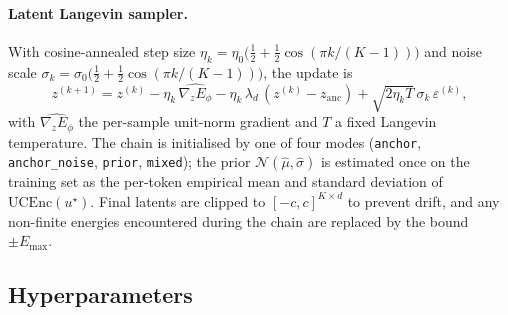 \documentclass{article}
\begin{document}
\paragraph{Latent Langevin sampler.}
With cosine-annealed step size $\eta_k = \eta_0\bigl(\tfrac{1}{2} + \tfrac{1}{2}\cos(\pi k/(K-1))\bigr)$ and noise scale $\sigma_k = \sigma_0\bigl(\tfrac{1}{2} + \tfrac{1}{2}\cos(\pi k/(K-1))\bigr)$, the update is
\begin{equation}
z^{(k+1)} = z^{(k)} - \eta_k\,\widehat{\nabla_z E_\phi} - \eta_k\,\lambda_d\,(z^{(k)} - z_{\mathrm{anc}}) + \sqrt{2\eta_k T}\,\sigma_k\,\varepsilon^{(k)},
\end{equation}
with $\widehat{\nabla_z E_\phi}$ the per-sample unit-norm gradient and $T$ a fixed Langevin temperature. The chain is initialised by one of four modes (\texttt{anchor}, \texttt{anchor\_noise}, \texttt{prior}, \texttt{mixed}); the prior $\mathcal{N}(\hat\mu, \hat\sigma)$ is estimated once on the training set as the per-token empirical mean and standard deviation of $\mathrm{UCEnc}(u^\star)$. Final latents are clipped to $[-c, c]^{K\times d}$ to prevent drift, and any non-finite energies encountered during the chain are replaced by the bound $\pm E_{\max}$.

\subsection{Hyperparameters}
\label{app:latent_stack_hp}
\end{document}
